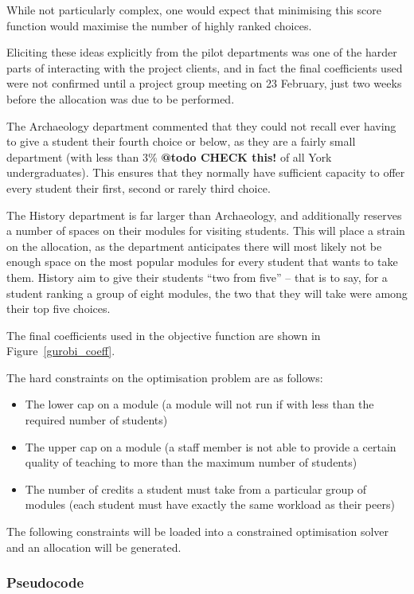 While not particularly complex, one would expect that minimising this score
function would maximise the number of highly ranked choices.

Eliciting these ideas explicitly from the pilot departments was one of the
harder parts of interacting with the project clients, and in fact the final
coefficients used were not confirmed until a project group meeting on 23
February, just two weeks before the allocation was due to be performed.

The Archaeology department commented that they could not recall ever having to
give a student their fourth choice or below, as they are a fairly small
department (with less than 3\% \textbf{@todo CHECK this!} of all York
undergraduates). This ensures that they normally have sufficient capacity to
offer every student their first, second or rarely third choice.

The History department is far larger than Archaeology, and additionally
reserves a number of spaces on their modules for visiting students. This will
place a strain on the allocation, as the department anticipates there will
most likely not be enough space on the most popular modules for every student
that wants to take them. History aim to give their students ``two from five''
-- that is to say, for a student ranking a group of eight modules, the two
that they will take were among their top five choices.

The final coefficients used in the objective function are shown in
Figure~\ref{gurobi_coeff}.

The hard constraints on the optimisation problem are as follows:

\begin{itemize}
  \item The lower cap on a module (a module will not run if with less than the
        required number of students)
  \item The upper cap on a module (a staff member is not able to provide a
        certain quality of teaching to more than the maximum number of
        students)
  \item The number of credits a student must take from a particular group of
        modules (each student must have exactly the same workload as their
        peers)
\end{itemize}

The following constraints will be loaded into a constrained optimisation
solver and an allocation will be generated.

\subsubsection{Pseudocode}

